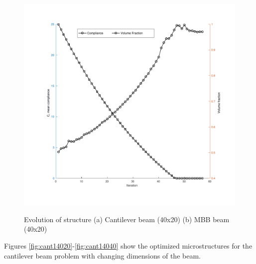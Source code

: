 \documentclass[openright,twoside]{iitkthesis}
\begin{document}
\begin{figure}[H]
\begin{center}
{        \includegraphics[clip, trim=2cm 2cm 2cm 1cm, scale=0.4]{./Plots/2d/mat14020h}
     }
\caption{Evolution of structure (a) Cantilever beam (40x20) (b) MBB beam (40x20)}
\label{fig:histories}
\end{center}
\end{figure}
Figures \ref{fig:cant14020}-\ref{fig:cant14040} show the optimized microstructures for the cantilever beam problem with changing dimensions of the beam.
\end{document}
